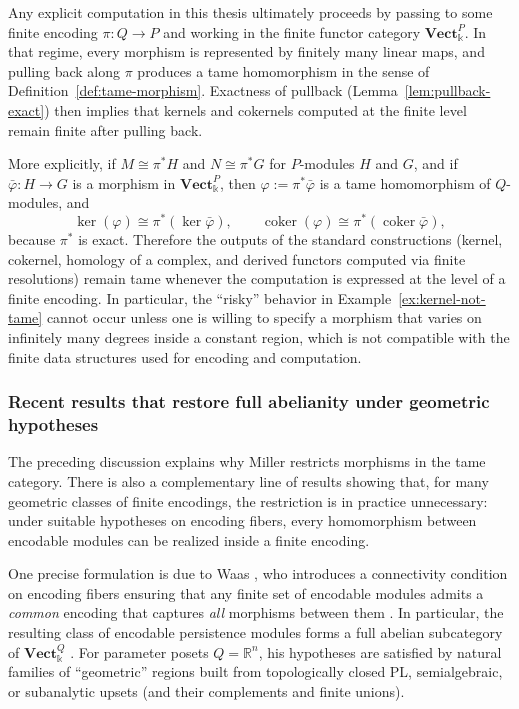 \documentclass{article}
\newcommand{\kk}{\Bbbk}
\newcommand{\<}{\langle}
\renewcommand{\>}{\rangle}
\DeclareMathOperator{\coker}{coker}
\theoremstyle{definition}
\theoremstyle{remark}
\begin{document}
	Any explicit computation in this thesis ultimately proceeds by passing to some finite encoding
	$\pi\colon Q\to P$ and working in the finite functor category $\mathbf{Vect}_{\kk}^{P}$.
	In that regime, every morphism is represented by finitely many linear maps, and pulling back
	along $\pi$ produces a tame homomorphism in the sense of Definition~\ref{def:tame-morphism}.
	Exactness of pullback (Lemma~\ref{lem:pullback-exact}) then implies that kernels and cokernels
	computed at the finite level remain finite after pulling back.

	More explicitly, if $M\cong\pi^{*}H$ and $N\cong\pi^{*}G$ for $P$-modules $H$ and $G$, and if
	$\bar\varphi\colon H\to G$ is a morphism in $\mathbf{Vect}_{\kk}^{P}$, then
	$\varphi:=\pi^{*}\bar\varphi$ is a tame homomorphism of $Q$-modules, and
	\[
		\ker(\varphi)\cong \pi^{*}(\ker\bar\varphi),
		\qquad
		\coker(\varphi)\cong \pi^{*}(\coker\bar\varphi),
	\]
	because $\pi^{*}$ is exact.  Therefore the outputs of the standard constructions
	(kernel, cokernel, homology of a complex, and derived functors computed via finite
	resolutions) remain tame whenever the computation is expressed at the level of a finite
	encoding.  In particular, the ``risky'' behavior in Example~\ref{ex:kernel-not-tame} cannot
	occur unless one is willing to specify a morphism that varies on infinitely many degrees
	inside a constant region, which is not compatible with the finite data structures used for
	encoding and computation.

	\subsubsection*{Recent results that restore full abelianity under geometric hypotheses}

	The preceding discussion explains why Miller restricts morphisms in the tame category.
	There is also a complementary line of results showing that, for many geometric classes of
	finite encodings, the restriction is in practice unnecessary: under suitable hypotheses on
	encoding fibers, every homomorphism between encodable modules can be realized inside a
	finite encoding.

	One precise formulation is due to Waas \cite{Waa24}, who introduces a connectivity condition
	on encoding fibers ensuring that any finite set of encodable modules admits a \emph{common}
	encoding that captures \emph{all} morphisms between them \cite[Prop.~3.5]{Waa24}.
	In particular, the resulting class of encodable persistence modules forms a full abelian
	subcategory of $\mathbf{Vect}_{\kk}^{Q}$ \cite[Thm.~1.1]{Waa24}.
	For parameter posets $Q=\mathbb{R}^n$, his hypotheses are satisfied by natural families of
	``geometric'' regions built from topologically closed PL, semialgebraic, or subanalytic
	upsets (and their complements and finite unions).
\end{document}
